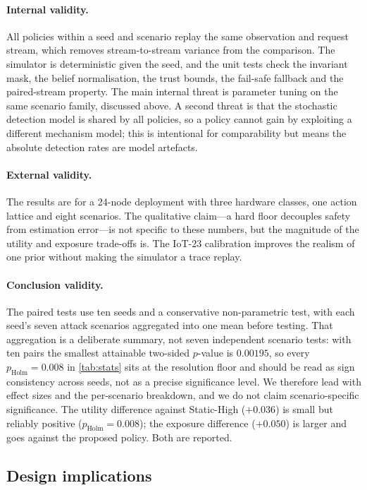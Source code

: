 \paragraph{Internal validity.} All policies within a seed and scenario replay the
same observation and request stream, which removes stream-to-stream variance from
the comparison. The simulator is deterministic given the seed, and the unit tests
check the invariant mask, the belief normalisation, the trust bounds, the
fail-safe fallback and the paired-stream property. The main internal threat is
parameter tuning on the same scenario family, discussed above. A second threat is
that the stochastic detection model is shared by all policies, so a policy cannot
gain by exploiting a different mechanism model; this is intentional for
comparability but means the absolute detection rates are model artefacts.

\paragraph{External validity.} The results are for a 24-node deployment with three
hardware classes, one action lattice and eight scenarios. The qualitative
claim---a hard floor decouples safety from estimation error---is not specific to
these numbers, but the magnitude of the utility and exposure trade-offs is. The
IoT-23 calibration improves the realism of one prior without making the simulator a
trace replay.

\paragraph{Conclusion validity.} The paired tests use ten seeds and a conservative
non-parametric test, with each seed's seven attack scenarios aggregated into one
mean before testing. That aggregation is a deliberate summary, not seven
independent scenario tests: with ten pairs the smallest attainable two-sided
$p$-value is $0.00195$, so every $p_{\text{Holm}}=0.008$ in \cref{tab:stats} sits
at the resolution floor and should be read as sign consistency across seeds, not
as a precise significance level. We therefore lead with effect sizes and the
per-scenario breakdown, and we do not claim scenario-specific significance. The utility
difference against Static-High ($+0.036$) is small but reliably positive
($p_{\text{Holm}}=0.008$); the exposure difference ($+0.050$) is larger and goes
against the proposed policy. Both are reported.

\subsection{Design implications}
\label{sec:implications}

